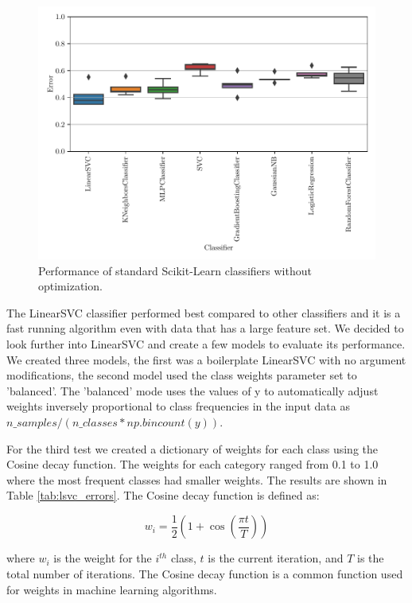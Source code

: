\begin{figure}[ht]
  \centering
  \includegraphics[width=\textwidth]{../img/plot_explore_classifiers.pdf}
  \caption{Performance of standard Scikit-Learn classifiers without optimization.}
  \label{fig:explore_classifiers}
\end{figure}

The LinearSVC classifier performed best compared to other classifiers and it is a fast running algorithm even with data that has a large feature set. We decided to look further into LinearSVC and create a few models to evaluate its performance. We created three models, the first was a boilerplate LinearSVC with no argument modifications, the second model used the class weights parameter set to 'balanced'. The 'balanced' mode uses the values of y to automatically adjust weights inversely proportional to class frequencies in the input data as $n\_samples / (n\_classes * np.bincount(y))$. 

For the third test we created a dictionary of weights for each class using the Cosine decay function. The weights for each category ranged from 0.1 to 1.0 where the most frequent classes had smaller weights. The results are shown in Table \ref{tab:lsvc_errors}. The Cosine decay function is defined as:

\begin{equation}
    w_i = \frac{1}{2} \left(1 + \cos \left(\frac{\pi t}{T}\right)\right)
\label{eq:cosine_decay}
\end{equation}

where $w_i$ is the weight for the $i^{th}$ class, $t$ is the current iteration, and $T$ is the total number of iterations. The Cosine decay function is a common function used for weights in machine learning algorithms.


